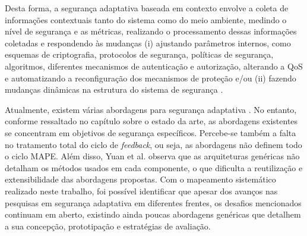 \documentclass[tid,table]{texufpel} %
\begin{document}
Desta forma, a segurança adaptativa baseada em contexto envolve a coleta de informações contextuais tanto do sistema como do meio ambiente, medindo o nível de segurança e as métricas, realizando o processamento dessas informações coletadas e respondendo às mudanças (i) ajustando parâmetros internos, como esquemas de criptografia, protocolos de segurança, políticas de segurança, algoritmos, diferentes mecanismos de autenticação e autorização, alterando a QoS e automatizando a reconfiguração dos mecanismos de proteção e/ou (ii) fazendo mudanças dinâmicas na estrutura do sistema de segurança \cite{habtamu12}.

Atualmente, existem várias abordagens para segurança adaptativa \cite{elkhodary07, yuan12}. No entanto, conforme ressaltado no capítulo sobre o estado da arte, as abordagens existentes se concentram em objetivos de segurança específicos. Percebe-se também a falta no tratamento total do ciclo de \textit{feedback}, ou seja, as abordagens não definem todo o ciclo MAPE. Além disso, Yuan et al. observa que as arquiteturas genéricas não detalham os métodos usados em cada componente, o que dificulta a reutilização e extensibilidade das abordagens propostas. Com o mapeamento sistemático realizado neste trabalho, foi possível identificar que apesar dos avanços nas pesquisas em segurança adaptativa em diferentes frentes, os desafios mencionados continuam em aberto, existindo ainda poucas abordagens genéricas que detalhem a sua concepção, prototipação e estratégias de avaliação.





\end{document}
